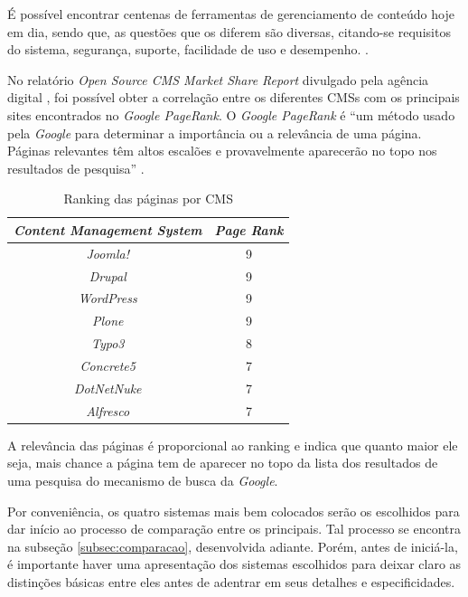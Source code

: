 \hspace{2.5cm}

É possível encontrar centenas de ferramentas de gerenciamento de conteúdo hoje em dia, sendo que, as questões que os diferem são diversas, citando-se requisitos do sistema, segurança, suporte, facilidade de uso e desempenho. .

No relatório \textit{Open Source CMS Market Share Report} divulgado pela agência digital , foi possível obter a correlação entre os diferentes CMSs com os principais sites encontrados no \textit{Google PageRank}. O \textit{Google PageRank} é ``um método usado pela \textit{Google} para determinar a importância ou a relevância de uma página. Páginas relevantes têm altos escalões e provavelmente aparecerão no topo nos resultados de pesquisa'' \cite[~p. 3, tradução nossa]{mirdha2014comparative}. 

\begin{table}[h]
\centering
{}
\caption{Ranking das páginas por CMS}
\vspace{0.5cm}
\begin{tabular}{c|c}
 
\textbf{\textit{Content Management System}} & \textbf{\textit{Page Rank}} \\ %
\hline                               %
\textit{Joomla!} & 9 \\
\textit{Drupal}  & 9 \\
\textit{WordPress} & 9 \\
\textit{Plone} & 9 \\
\textit{Typo3} & 8  \\          %
\textit{Concrete5} & 7 \\
\textit{DotNetNuke} & 7 \\
\textit{Alfresco} & 7 \\
\hline
\end{tabular}
\label{pagerank}
\end{table}

A relevância das páginas é proporcional ao ranking e indica que quanto maior ele seja, mais chance a página tem de aparecer
no topo da lista dos resultados de uma pesquisa do mecanismo de busca da \textit{Google}.

Por conveniência, os quatro sistemas mais bem colocados serão os escolhidos para dar início ao processo de comparação entre os principais. Tal processo se encontra na subseção \ref{subsec:comparacao}, desenvolvida adiante. Porém, antes de iniciá-la, é importante haver uma apresentação dos sistemas escolhidos para deixar claro as distinções básicas entre eles antes de adentrar em seus detalhes e especificidades.

